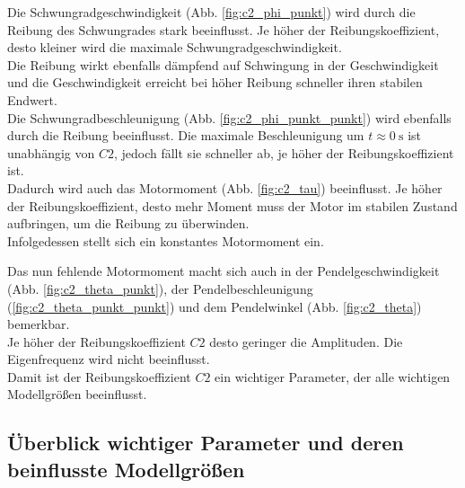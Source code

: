Die Schwungradgeschwindigkeit (Abb. \ref{fig:c2_phi_punkt}) wird durch die Reibung des Schwungrades stark beeinflusst. Je höher der Reibungskoeffizient, desto kleiner wird die maximale Schwungradgeschwindigkeit.\\
Die Reibung wirkt ebenfalls dämpfend auf Schwingung in der Geschwindigkeit und die Geschwindigkeit erreicht bei höher Reibung schneller ihren stabilen Endwert.\\

Die Schwungradbeschleunigung (Abb. \ref{fig:c2_phi_punkt_punkt}) wird ebenfalls durch die Reibung beeinflusst. Die maximale Beschleunigung um $t\approx\SI{0}{\s}$ ist unabhängig von $C2$, jedoch fällt sie schneller ab, je höher der Reibungskoeffizient ist.\\

Dadurch wird auch das Motormoment (Abb. \ref{fig:c2_tau}) beeinflusst. Je höher der Reibungskoeffizient, desto mehr Moment muss der Motor im stabilen Zustand aufbringen, um die Reibung zu überwinden.\\
Infolgedessen stellt sich ein konstantes Motormoment ein.

Das nun fehlende Motormoment macht sich auch in der Pendelgeschwindigkeit (Abb. \ref{fig:c2_theta_punkt}), der Pendelbeschleunigung (\ref{fig:c2_theta_punkt_punkt}) und dem Pendelwinkel (Abb. \ref{fig:c2_theta}) bemerkbar.\\
Je höher der Reibungskoeffizient $C2$ desto geringer die Amplituden.
Die Eigenfrequenz wird nicht beeinflusst.\\

Damit ist der Reibungskoeffizient $C2$ ein wichtiger Parameter, der alle wichtigen Modellgrößen beeinflusst.
\pagebreak
\subsection*{Überblick wichtiger Parameter und deren beinflusste Modellgrößen}


